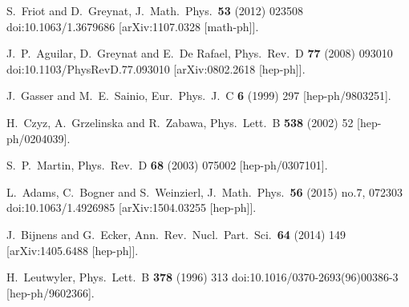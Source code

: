 \documentclass[12pt,a4paper]{article}
\begin{document}
\begin{thebibliography}{99}
  S.~Friot and D.~Greynat,
  J.\ Math.\ Phys.\  {\bf 53} (2012) 023508
  doi:10.1063/1.3679686
  [arXiv:1107.0328 [math-ph]].

  J.~P.~Aguilar, D.~Greynat and E.~De Rafael,
  Phys.\ Rev.\ D {\bf 77} (2008) 093010
  doi:10.1103/PhysRevD.77.093010
  [arXiv:0802.2618 [hep-ph]].

  J.~Gasser and M.~E.~Sainio,
  Eur.\ Phys.\ J.\ C {\bf 6} (1999) 297
  [hep-ph/9803251].

  H.~Czyz, A.~Grzelinska and R.~Zabawa,
  Phys.\ Lett.\ B {\bf 538} (2002) 52
  [hep-ph/0204039].

  S.~P.~Martin,
  Phys.\ Rev.\ D {\bf 68} (2003) 075002
  [hep-ph/0307101].

  L.~Adams, C.~Bogner and S.~Weinzierl,
  J.\ Math.\ Phys.\  {\bf 56} (2015) no.7,  072303
  doi:10.1063/1.4926985
  [arXiv:1504.03255 [hep-ph]].

  J.~Bijnens and G.~Ecker,
  Ann.\ Rev.\ Nucl.\ Part.\ Sci.\  {\bf 64} (2014) 149
  [arXiv:1405.6488 [hep-ph]].

  H.~Leutwyler,
  Phys.\ Lett.\ B {\bf 378} (1996) 313
  doi:10.1016/0370-2693(96)00386-3
  [hep-ph/9602366].


\end{thebibliography}
\end{document}
